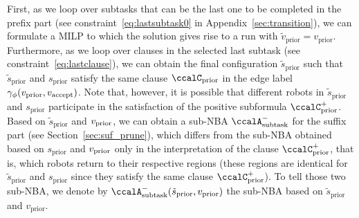 \documentclass[Afour,sageh,times]{sagej}
\newcommand{\auto}[1]{\ccalA_{\textup{#1}}}
\newcommand{\vertex}[1]{v_{\textup{#1}}}
\begin{document}
{{First, as we loop over subtasks that can be the last one to be completed in the prefix part (see constraint~\eqref{eq:lastsubtask0} in Appendix~\ref{sec:transition}), we can formulate a MILP to which the solution gives rise to a run with $\tilde{v}_{\text{prior}} = {v}_{\text{prior}}$. Furthermore, as we loop over clauses in the selected last subtask (see constraint~\eqref{eq:lastclause}), we can obtain the final configuration $\tilde{s}_{\text{prior}}$ such that $\tilde{s}_{\text{prior}}$ and ${s}_{\text{prior}}$ satisfy the same clause $\ccalC_{\text{prior}}$ in the edge label $\gamma_\phi(\vertex{prior}, \vertex{accept})$. Note that, however, it is possible that different robots in $\tilde{s}_{\text{prior}}$ and $s_{\text{prior}}$ participate in the satisfaction of the positive subformula $\ccalC_\text{prior}^+$. Based on $\tilde{s}_{\text{prior}}$ and $\vertex{prior}$, we can obtain a sub-NBA $\auto{subtask}^-$ for the suffix part (see Section~\ref{sec:suf_prune}), which  differs from the sub-NBA obtained based on  $s_{\text{prior}}$ and $\vertex{prior}$ only in the interpretation of the  clause $\ccalC_\text{prior}^+$, that is, which robots return to their respective regions (these regions are identical for $\tilde{s}_{\text{prior}}$ and $s_{\text{prior}}$ since they satisfy the same clause $\ccalC_{\text{prior}}^+$). To tell those two sub-NBA, we denote by $\auto{subtask}^-( \tilde{s}_{\text{prior}},  {v}_{\text{prior}})$ the sub-NBA based on $\tilde{s}_{\text{prior}} $ and $  {v}_{\text{prior}}$.

}}
\end{document}

